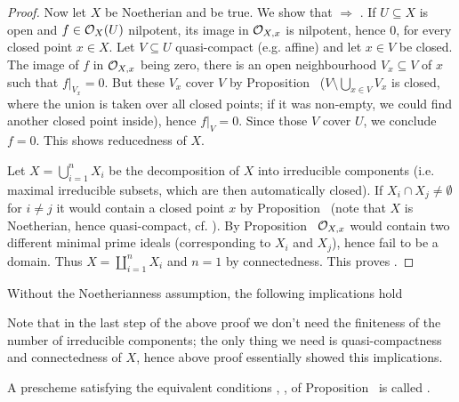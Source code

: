 \documentclass[a4paper,parskip=half,numbers=enddot, DIV=12]{scrreprt}
\begin{document}
\begin{proof}
    Now let $X$ be Noetherian and  be true. We show that  $\Rightarrow$ . If $U\subseteq X$ is open and $f\in \mathcal{O}_X(U)$ nilpotent, its image in $\mathcal{O}_{X,x}$ is nilpotent, hence $0$, for every closed point $x\in X$. Let $V\subseteq U$ quasi-compact (e.g. affine) and let $x\in V$ be closed. The image of $f$ in $\mathcal{O}_{X,x}$ being zero, there is an open neighbourhood $V_x\subseteq V$ of $x$ such that $f|_{V_x} = 0$. But these $V_x$ cover $V$ by Proposition~ ($V\setminus\bigcup_{x\in V} V_x$ is closed, where the union is taken over all closed points; if it was non-empty, we could find another closed point inside), hence $f|_V = 0$. Since those $V$ cover $U$, we conclude $f= 0$. This shows reducedness of $X$.
    
    Let $X=\bigcup_{i=1}^nX_i$ be the decomposition of $X$ into irreducible components (i.e. maximal irreducible subsets, which are then automatically closed). If $X_i\cap X_j \neq \emptyset$ for $i\neq j$ it would contain a closed point $x$ by Proposition~ (note that $X$ is Noetherian, hence quasi-compact, cf. \cite[Definition~2.1.2]{alg1}). By Proposition~ $\mathcal{O}_{X,x}$ would contain two different minimal prime ideals (corresponding to $X_i$ and $X_j$), hence fail to be a domain. Thus $X=\coprod_{i=1}^nX_i$ and $n=1$ by connectedness. This proves .
\end{proof}
\begin{rem}%
	Without the Noetherianness assumption, the following implications hold
	\begin{center}
	\end{center}
	Note that in the last step of the above proof we don't need the finiteness of the number of irreducible components; the only thing we need is quasi-compactness and connectedness of $X$, hence above proof essentially showed this implications.
\end{rem}
\begin{defi}
    A prescheme satisfying the equivalent conditions , ,  of Proposition~ is called .
\end{defi}
\end{document}
